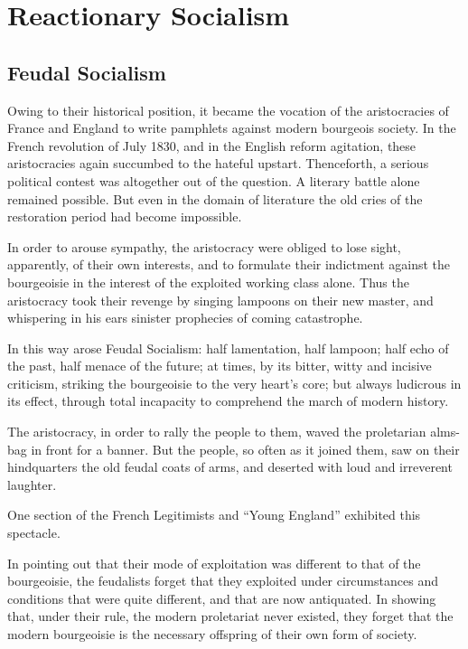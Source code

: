\section*{Reactionary Socialism}

\subsection*{Feudal Socialism}

Owing to their historical position, it became the vocation of the
aristocracies of France and England to write pamphlets against modern
bourgeois society. In the French revolution of July 1830, and in the
English reform agitation, these aristocracies again succumbed to the
hateful upstart. Thenceforth, a serious political contest was
altogether out of the question. A literary battle alone remained
possible. But even in the domain of literature the old cries of the
restoration period had become impossible.

In order to arouse sympathy, the aristocracy were obliged to lose
sight, apparently, of their own interests, and to formulate their
indictment against the bourgeoisie in the interest of the exploited
working class alone. Thus the aristocracy took their revenge by singing
lampoons on their new master, and whispering in his ears sinister
prophecies of coming catastrophe.

In this way arose Feudal Socialism: half lamentation, half lampoon;
half echo of the past, half menace of the future; at times, by its
bitter, witty and incisive criticism, striking the bourgeoisie to the
very heart’s core; but always ludicrous in its effect, through total
incapacity to comprehend the march of modern history.

The aristocracy, in order to rally the people to them, waved the
proletarian alms-bag in front for a banner. But the people, so often as
it joined them, saw on their hindquarters the old feudal coats of arms,
and deserted with loud and irreverent laughter.

One section of the French Legitimists and \enquote{Young England} exhibited
this spectacle.

In pointing out that their mode of exploitation was different to that
of the bourgeoisie, the feudalists forget that they exploited under
circumstances and conditions that were quite different, and that are
now antiquated. In showing that, under their rule, the modern
proletariat never existed, they forget that the modern bourgeoisie is
the necessary offspring of their own form of society.

